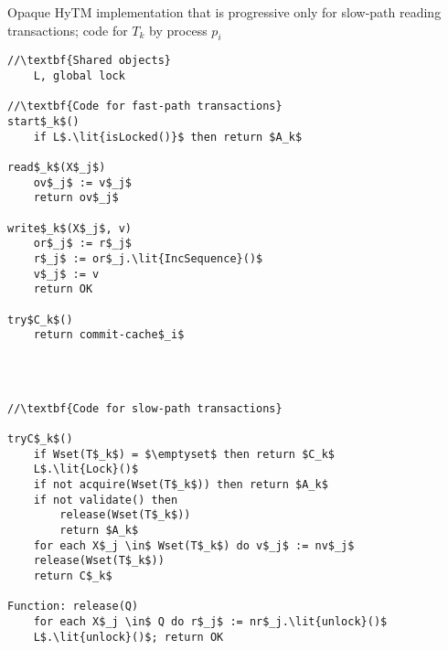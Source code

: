 \begin{algorithm*}[!t]
\caption{Opaque HyTM implementation that is progressive only for slow-path reading transactions; code for $T_k$ by process $p_i$}
\label{alg:inswrite2}
\vspace{-2mm}
\noindent\lstset{style=customc}
\begin{minipage}{0.43\textwidth}
\begin{lstlisting}[frame=none,firstnumber=1,mathescape=true]
//\textbf{Shared objects}
    L, global lock

//\textbf{Code for fast-path transactions}
start$_k$()
    if L$.\lit{isLocked()}$ then return $A_k$

read$_k$(X$_j$)
    ov$_j$ := v$_j$ 
    return ov$_j$

write$_k$(X$_j$, v)
    or$_j$ := r$_j$ 
    r$_j$ := or$_j.\lit{IncSequence}()$ 
    v$_j$ := v 
    return OK

try$C_k$()
    return commit-cache$_i$ 
\end{lstlisting}
\end{minipage}
\hspace{0.02\textwidth}
\begin{minipage}{0.54\textwidth}
\begin{lstlisting}[frame=none,firstnumber=last,mathescape=true]



//\textbf{Code for slow-path transactions}

tryC$_k$()
    if Wset(T$_k$) = $\emptyset$ then return $C_k$
    L$.\lit{Lock}()$
    if not acquire(Wset(T$_k$)) then return $A_k$
    if not validate() then
        release(Wset(T$_k$))
        return $A_k$
    for each X$_j \in$ Wset(T$_k$) do v$_j$ := nv$_j$
    release(Wset(T$_k$))
    return C$_k$
    
Function: release(Q)
    for each X$_j \in$ Q do r$_j$ := nr$_j.\lit{unlock}()$
    L$.\lit{unlock}()$; return OK
\end{lstlisting}
\end{minipage}
\vspace{-2mm}
\end{algorithm*}
